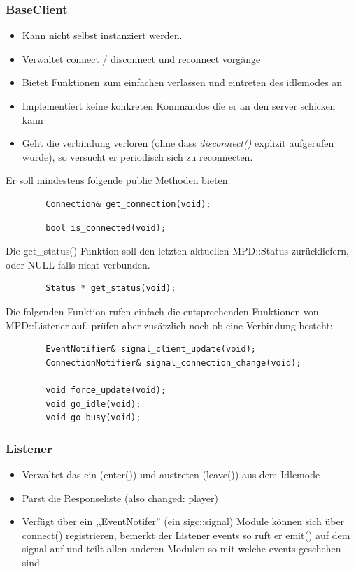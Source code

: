 \subsubsection{BaseClient}
\begin{itemize}
    \item Kann nicht selbst instanziert werden.
    \item Verwaltet connect / disconnect und reconnect vorgänge
    \item Bietet Funktionen zum einfachen verlassen und eintreten des idlemodes an 
    \item Implementiert keine konkreten Kommandos die er an den server schicken kann
    \item Geht die verbindung verloren (ohne dass \emph{disconnect()} explizit aufgerufen wurde),
        so versucht er periodisch sich zu reconnecten.
\end{itemize}
Er soll mindestens folgende public Methoden bieten:

\begin{verbatim}
        Connection& get_connection(void);
\end{verbatim}

\begin{verbatim}
        bool is_connected(void);
\end{verbatim}
Die get\_status() Funktion soll den letzten aktuellen MPD::Status zurückliefern,
oder NULL falls nicht verbunden. 
\begin{verbatim}        
        Status * get_status(void);
\end{verbatim}

Die folgenden Funktion rufen einfach die entsprechenden Funktionen von MPD::Listener auf,
prüfen aber zusätzlich noch ob eine Verbindung besteht:
\begin{verbatim}
        EventNotifier& signal_client_update(void);
        ConnectionNotifier& signal_connection_change(void);

        void force_update(void);
        void go_idle(void);
        void go_busy(void);
\end{verbatim}

\subsubsection{Listener}
\begin{itemize}
    \item Verwaltet das ein-(enter()) und austreten (leave()) aus dem Idlemode
    \item Parst die Responseliste (also changed: player)
    \item Verfügt über ein ,,EventNotifer'' (ein sigc::signal)
        Module können sich über connect() registrieren,
        bemerkt der Listener events so ruft er emit() auf dem signal auf
        und teilt allen anderen Modulen so mit welche events geschehen sind.
\end{itemize}

